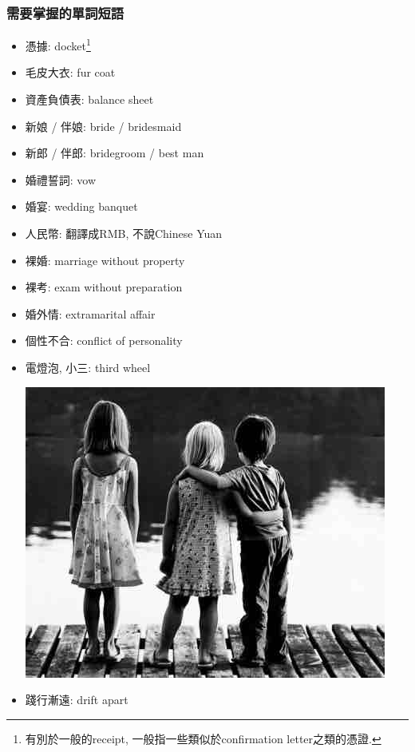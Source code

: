 \subsubsection*{需要掌握的單詞短語}
\begin{multicols}{2}
\begin{itemize}
  \itemsep0em
  \item 憑據: docket\footnote{有別於一般的receipt, 一般指一些類似於confirmation letter之類的憑證.}
  \item 毛皮大衣: fur coat
  \item 資產負債表: balance sheet
  \item 新娘 / 伴娘: bride / bridesmaid
  \item 新郎 / 伴郎: bridegroom / best man
  \item 婚禮誓詞: vow
  \item 婚宴: wedding banquet
  \item 人民幣: 翻譯成RMB, 不說Chinese Yuan
  \item 裸婚: marriage without property
  \item 裸考: exam without preparation
  \item 婚外情: extramarital affair
  \item 個性不合: conflict of personality
  \item 電燈泡, 小三: third wheel
  \begin{center}
  	\includegraphics[scale=.45]{pics/third-wheel}
  \end{center}
  \item 踐行漸遠: drift apart
\end{itemize}
\end{multicols}

